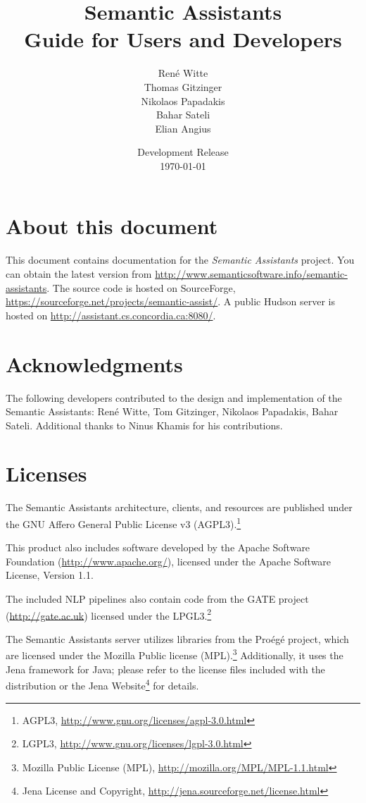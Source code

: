 \documentclass[10pt,twoside,openany,bibtotoc,liststotoc,chapterprefix]{scrbook}
\title{Semantic Assistants\bigskip\\
\Large Guide for Users and Developers}
\author{Ren\'{e} Witte\\
Thomas Gitzinger\\
Nikolaos Papadakis\\
Bahar Sateli\\
Elian Angius
\medskip}
\date{Development Release\\
\today
}
\begin{document}
\frontmatter
\maketitle
{}\tableofcontents

\section*{About this document}
This document contains documentation for the \emph{Semantic
  Assistants} project. You can obtain the latest version from
\url{http://www.semanticsoftware.info/semantic-assistants}. The source
code is hosted on SourceForge,
\url{https://sourceforge.net/projects/semantic-assist/}.  A public
Hudson server is hosted on
\url{http://assistant.cs.concordia.ca:8080/}.

\section*{Acknowledgments}
The following developers contributed to the design and implementation
of the Semantic Assistants: Ren\'{e} Witte, Tom Gitzinger, Nikolaos
Papadakis, Bahar Sateli. Additional thanks to Ninus Khamis for
his contributions.

\section*{Licenses}
The Semantic Assistants architecture, clients, and resources are
published under the GNU Affero General Public License v3
(AGPL3).\footnote{AGPL3,
  \url{http://www.gnu.org/licenses/agpl-3.0.html}}

This product also includes software developed by the Apache Software
Foundation (\url{http://www.apache.org/}), licensed under the Apache
Software License, Version 1.1.

The included NLP pipelines also contain code from the GATE project
(\url{http://gate.ac.uk}) licensed under the LPGL3.\footnote{LGPL3, \url{http://www.gnu.org/licenses/lgpl-3.0.html}}

The Semantic Assistants server utilizes libraries from the Pro\'eg\'e
project, which are licensed under the Mozilla Public license
(MPL).\footnote{Mozilla Public License (MPL),
  \url{http://mozilla.org/MPL/MPL-1.1.html}} Additionally, it uses
the Jena framework for Java; please refer to the license files included with
the distribution or the Jena Website\footnote{Jena License and
  Copyright, \url{http://jena.sourceforge.net/license.html}} for details.

\mainmatter








\backmatter
\appendix


\end{document}
